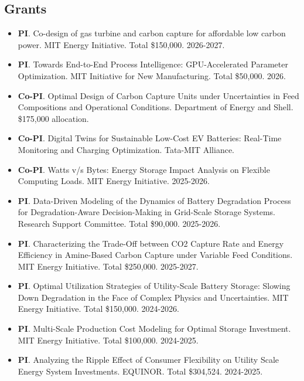 \subsection*{Grants}
\begin{itemize}[itemsep=1pt, parsep=0pt,leftmargin=*]
\item[] \textbf{PI}. Co-design of gas turbine and carbon capture for affordable low carbon power. MIT Energy Initiative. Total \$150,000. 2026-2027.
\item[] \textbf{PI}. Towards End-to-End Process Intelligence: GPU-Accelerated Parameter Optimization. MIT Initiative for New Manufacturing. Total \$50,000. 2026.
\item[] \textbf{Co-PI}. Optimal Design of Carbon Capture Units under Uncertainties in Feed Compositions and Operational Conditions. Department of Energy and Shell. \$175,000 allocation. 
\item[] \textbf{Co-PI}. Digital Twins for Sustainable Low-Cost EV Batteries: Real-Time Monitoring and Charging Optimization. Tata-MIT Alliance. 
\item[] \textbf{Co-PI}. Watts v/s Bytes: Energy Storage Impact Analysis on Flexible Computing Loads. MIT Energy Initiative. 2025-2026.
\item[] \textbf{PI}. Data-Driven Modeling of the Dynamics of Battery Degradation Process for Degradation-Aware Decision-Making in Grid-Scale Storage Systems.  Research Support Committee. Total \$90,000. 2025-2026.
\item[] \textbf{PI}. Characterizing the Trade-Off between CO2 Capture Rate and Energy Efficiency in Amine-Based Carbon Capture under Variable Feed Conditions. MIT Energy Initiative. Total \$250,000. 2025-2027.
\item[] \textbf{PI}. Optimal Utilization Strategies of Utility-Scale Battery Storage: Slowing Down Degradation in the Face of Complex Physics and Uncertainties. MIT Energy Initiative. Total \$150,000. 2024-2026.
\item[] \textbf{PI}. Multi-Scale Production Cost Modeling for Optimal Storage Investment. MIT Energy Initiative. Total \$100,000. 2024-2025.
\item[] \textbf{PI}. Analyzing the Ripple Effect of Consumer Flexibility on Utility Scale Energy System Investments. EQUINOR. Total \$304,524. 2024-2025.
\end{itemize}


